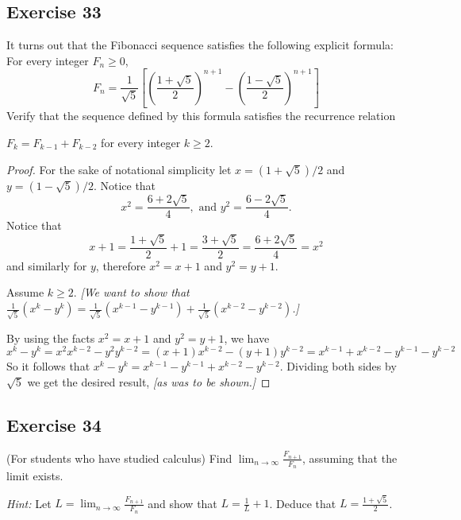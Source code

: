 \documentclass[14pt]{extarticle}
\newcommand{\dps}{\displaystyle}
\begin{document}
\subsection{Exercise 33}
It turns out that the Fibonacci sequence satisfies the following explicit formula: For every integer $F_n \geq 0$,
\[
F_n = \frac{1}{\sqrt{5}}\left[\left(\frac{1 + \sqrt{5}}{2}\right)^{n+1} - \left(\frac{1 - \sqrt{5}}{2}\right)^{n+1}\right]
\]
Verify that the sequence defined by this formula satisfies the recurrence relation 

\(F_k = F_{k - 1} + F_{k - 2}\) for every integer $k \geq 2$.

\begin{proof}
For the sake of notational simplicity let \(x = (1 + \sqrt{5}) / 2\) and \(y = (1 - \sqrt{5}) / 2\). Notice that
\[
x^2 = \frac{6 + 2\sqrt{5}}{4}, \text{ and } y^2 = \frac{6 - 2\sqrt{5}}{4}.
\]
Notice that
\[
x + 1 = \frac{1 + \sqrt{5}}{2} + 1 = \frac{3 + \sqrt{5}}{2} = \frac{6 + 2\sqrt{5}}{4} = x^2
\]
and similarly for \(y\), therefore \(x^2 = x+1\) and \(y^2 = y+1\).

Assume $k \geq 2$. {\it [We want to show that \(\dps \frac{1}{\sqrt{5}}(x^k - y^k) = \frac{1}{\sqrt{5}}(x^{k-1} - y^{k-1}) + \frac{1}{\sqrt{5}}(x^{k-2} - y^{k-2})\).]}

By using the facts \(x^2 = x+1\) and \(y^2 = y+1\), we have
\[
x^k - y^k = x^2x^{k-2} - y^2y^{k-2} = (x+1)x^{k-2} - (y+1)y^{k-2} = x^{k-1} + x^{k-2} - y^{k-1} - y^{k-2}
\]
So it follows that \(x^k - y^k = x^{k-1} - y^{k-1} + x^{k-2} - y^{k-2}.\) Dividing both sides by \(\sqrt{5}\)
we get the desired result, {\it [as was to be shown.]}
\end{proof}

\subsection{Exercise 34}
(For students who have studied calculus) Find \(\dps \lim_{n \to \infty} \frac{F_{n+1}}{F_n}\), 
assuming that the limit exists.

{\it Hint:} Let \(\dps L = \lim_{n \to \infty} \frac{F_{n+1}}{F_n}\) and show that \(\dps L = \frac{1}{L} 
+ 1\). Deduce that \(\dps L = \frac{1 + \sqrt{5}}{2}\).
\end{document}
